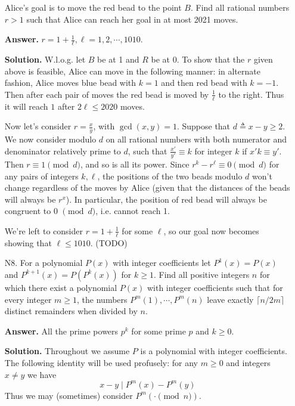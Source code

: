 \documentclass[11pt,a4paper]{article}
\begin{document}
\begin{enumerate}
	    Alice’s goal is to move the red bead to the point $B$. 
	    Find all rational numbers $r > 1$ such that Alice can reach her goal in at most 2021 moves.
	    
	    \textbf{Answer.} $r = 1+\frac 1{\ell}, \ell=1, 2, \cdots, 1010$. 
	    
	    \textbf{Solution.} 
	    W.l.o.g. let $B$ be at 1 and $R$ be at 0. 
	    To show that the $r$ given above is feasible, 
	    Alice can move in the following manner: 
	    in alternate fashion, Alice moves blue bead with $k=1$ and then red bead with $k=-1$. 
	    Then after each pair of moves the red bead is moved by $\frac{1}{\ell}$ to the right. 
	    Thus it will reach $1$ after $2\ell\le 2020$ moves. 
	    
	    Now let's consider $r=\frac{x}{y}$, with $\gcd(x, y)=1$. 
	    Suppose that $d\triangleq x - y\ge 2$. 
	    We now consider modulo $d$ on all rational numbers with both numerator and denominator relatively prime to $d$, 
	    such that $\frac{x'}{y'}\equiv k$ for integer $k$ if $x'k\equiv y'$. 
	    Then $r\equiv 1\pmod{d}$, and so is all its power. 
	    Since $r^k-r^{\ell}\equiv 0\pmod{d}$ for any pairs of integers $k, \ell$, 
	    the positions of the two beads modulo $d$ won't change regardless of the moves by Alice (given that the distances of the beads will always be $r^{x}$). 
	    In particular, the position of red bead will always be congruent to 0 $\pmod{d}$, 
	    i.e. cannot reach 1. 
	    
	    We're left to consider $r = 1 + \frac 1{\ell}$ for some $\ell$, so our goal now becomes showing that $\ell\le 1010$. (TODO)
	    
	    \item [N8.]
	    For a polynomial $P(x)$ with integer coefficients let $P^{1}(x) = P(x)$ and $P^{k+1}(x) = P(P^k(x))$ for $k \ge 1$. 
	    Find all positive integers $n$ for which there exist a polynomial $P(x)$ with integer coefficients such that for every integer $m \ge 1$, 
	    the numbers $P^m(1), \cdots, P^ m(n)$ leave exactly $\lceil n/2m\rceil$ distinct remainders when divided by $n$. 
	    
	    \textbf{Answer.} All the prime powers $p^k$ for some prime $p$ and $k\ge 0$. 
	    
	    \textbf{Solution.} 
	    Throughout we assume $P$ is a polynomial with integer coefficients. 
	    The following identity will be used profusely: for any $m\ge 0$ and integers $x\neq y$ we have 
	    \[
	    x-y\mid P^m(x)-P^m(y)
	    \]
	    Thus we may (sometimes) consider $P^m(\cdot \pmod{n})$. 
	    

\end{enumerate}
\end{document}
